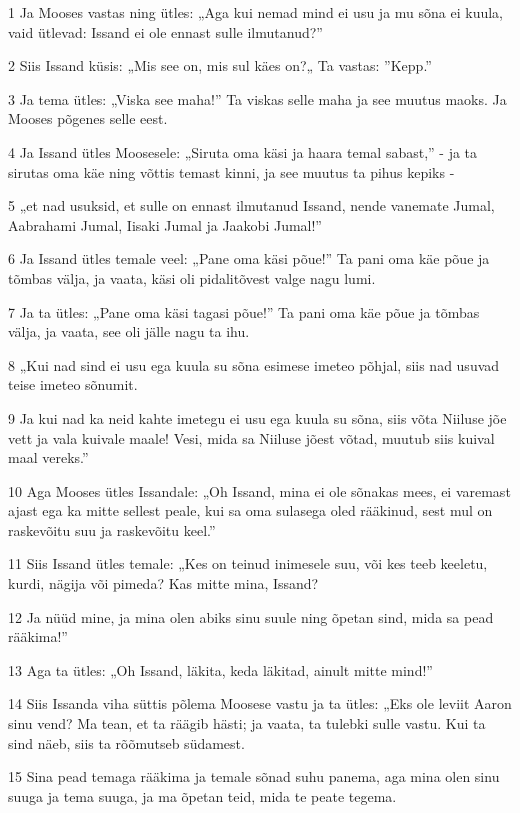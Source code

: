 \par 1 Ja Mooses vastas ning ütles: „Aga kui nemad mind ei usu ja mu sõna ei kuula, vaid ütlevad: Issand ei ole ennast sulle ilmutanud?”
\par 2 Siis Issand küsis: „Mis see on, mis sul käes on?„ Ta vastas: ”Kepp.”
\par 3 Ja tema ütles: „Viska see maha!” Ta viskas selle maha ja see muutus maoks. Ja Mooses põgenes selle eest.
\par 4 Ja Issand ütles Moosesele: „Siruta oma käsi ja haara temal sabast,” - ja ta sirutas oma käe ning võttis temast kinni, ja see muutus ta pihus kepiks -
\par 5 „et nad usuksid, et sulle on ennast ilmutanud Issand, nende vanemate Jumal, Aabrahami Jumal, Iisaki Jumal ja Jaakobi Jumal!”
\par 6 Ja Issand ütles temale veel: „Pane oma käsi põue!” Ta pani oma käe põue ja tõmbas välja, ja vaata, käsi oli pidalitõvest valge nagu lumi.
\par 7 Ja ta ütles: „Pane oma käsi tagasi põue!” Ta pani oma käe põue ja tõmbas välja, ja vaata, see oli jälle nagu ta ihu.
\par 8 „Kui nad sind ei usu ega kuula su sõna esimese imeteo põhjal, siis nad usuvad teise imeteo sõnumit.
\par 9 Ja kui nad ka neid kahte imetegu ei usu ega kuula su sõna, siis võta Niiluse jõe vett ja vala kuivale maale! Vesi, mida sa Niiluse jõest võtad, muutub siis kuival maal vereks.”
\par 10 Aga Mooses ütles Issandale: „Oh Issand, mina ei ole sõnakas mees, ei varemast ajast ega ka mitte sellest peale, kui sa oma sulasega oled rääkinud, sest mul on raskevõitu suu ja raskevõitu keel.”
\par 11 Siis Issand ütles temale: „Kes on teinud inimesele suu, või kes teeb keeletu, kurdi, nägija või pimeda? Kas mitte mina, Issand?
\par 12 Ja nüüd mine, ja mina olen abiks sinu suule ning õpetan sind, mida sa pead rääkima!”
\par 13 Aga ta ütles: „Oh Issand, läkita, keda läkitad, ainult mitte mind!”
\par 14 Siis Issanda viha süttis põlema Moosese vastu ja ta ütles: „Eks ole leviit Aaron sinu vend? Ma tean, et ta räägib hästi; ja vaata, ta tulebki sulle vastu. Kui ta sind näeb, siis ta rõõmutseb südamest.
\par 15 Sina pead temaga rääkima ja temale sõnad suhu panema, aga mina olen sinu suuga ja tema suuga, ja ma õpetan teid, mida te peate tegema.
